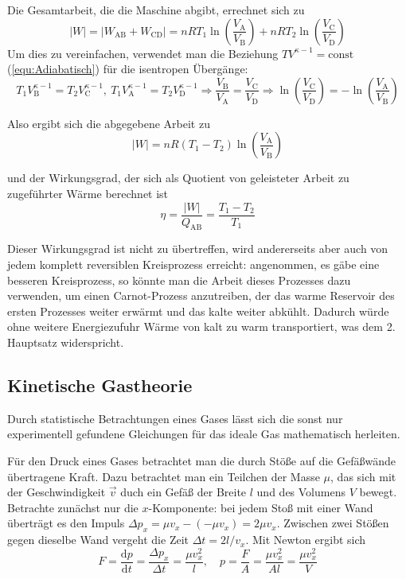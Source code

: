 \documentclass[a4paper]{scrartcl}
\begin{document}
Die Gesamtarbeit, die die Maschine abgibt, errechnet sich zu
\begin{equation*}
  |W| = |W_\text{AB} + W_\text{CD}| = nRT_1\ln\left( \frac{V_\text{A}}{V_\text{B}} \right) + nRT_2 \ln \left( \frac{V_\text{C}}{V_\text{D}} \right)
\end{equation*}
Um dies zu vereinfachen, verwendet man die Beziehung $TV^{\kappa-1} = \text{const}$ (\ref{equ:Adiabatisch}) für die isentropen Übergänge:
\begin{equation*}
  T_1V_\text{B}^{\kappa-1} = T_2V_\text{C}^{\kappa-1},~ T_1V_\text{A}^{\kappa-1} = T_2V_\text{D}^{\kappa-1} \Rightarrow \frac{V_\text{B}}{V_\text{A}} = \frac{V_\text{C}}{V_\text{D}} \Rightarrow \ln \left( \frac{V_\text{C}}{V_\text{D}} \right) = - \ln \left( \frac{V_\text{A}}{V_\text{B}} \right)
\end{equation*}

Also ergibt sich die abgegebene Arbeit zu
\begin{equation*}
  |W| = nR(T_1-T_2)\ln\left( \frac{V_\text{A}}{V_\text{B}} \right)
\end{equation*}

und der Wirkungsgrad, der sich als Quotient von geleisteter Arbeit zu zugeführter Wärme berechnet ist
\begin{equation*}
  \eta = \frac{|W|}{Q_\text{AB}} = \frac{T_1 - T_2}{T_1}
\end{equation*}

Dieser Wirkungsgrad ist nicht zu übertreffen, wird andererseits aber auch von jedem komplett reversiblen Kreisprozess erreicht: angenommen, es gäbe eine besseren Kreisprozess, so könnte man die Arbeit dieses Prozesses dazu verwenden, um einen Carnot-Prozess anzutreiben, der das warme Reservoir des ersten Prozesses weiter erwärmt und das kalte weiter abkühlt. Dadurch würde ohne weitere Energiezufuhr Wärme von kalt zu warm transportiert, was dem 2. Hauptsatz widerspricht.

\subsection{Kinetische Gastheorie}
Durch statistische Betrachtungen eines Gases lässt sich die sonst nur experimentell gefundene Gleichungen für das ideale Gas mathematisch herleiten.

Für den Druck eines Gases betrachtet man die durch Stöße auf die Gefäßwände übertragene Kraft. Dazu betrachtet man ein Teilchen der Masse $\mu$, das sich mit der Geschwindigkeit $\vec v$ duch ein Gefäß der Breite $l$ und des Volumens $V$ bewegt. Betrachte zunächst nur die $x$-Komponente: bei jedem Stoß mit einer Wand überträgt es den Impuls $\Delta p_x = \mu v_x - (-\mu v_x) = 2\mu v_x$. Zwischen zwei Stößen gegen dieselbe Wand vergeht die Zeit $\Delta t = 2l/v_x$. Mit Newton ergibt sich
\begin{equation*}
  F = \frac{\text{d}p}{\text{d}t} = \frac{\Delta p_x}{\Delta t} = \frac{\mu v_x^2}{l}, \quad p = \frac{F}{A} = \frac{\mu v_x^2}{Al} = \frac{\mu v_x^2}{V}
\end{equation*}
\end{document}
